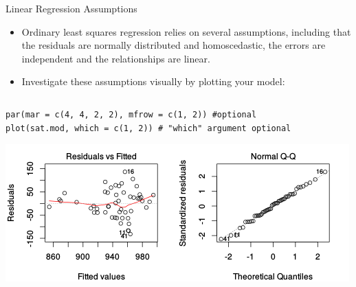 \documentclass[table,smaller]{beamer}
\begin{document}
\begin{frame}[fragile,label=sec-2-6]{Linear Regression Assumptions}
 \begin{itemize}
\item Ordinary least squares regression relies on several assumptions, including that the residuals are normally distributed and homoscedastic, the errors are independent and the relationships are linear.

\item Investigate these assumptions visually by plotting your model:
\end{itemize}
\begin{columns}  \begin{block}{}
\begin{verbatim}
par(mar = c(4, 4, 2, 2), mfrow = c(1, 2)) #optional
plot(sat.mod, which = c(1, 2)) # "which" argument optional
\end{verbatim}

\includegraphics[width=.9\linewidth]{images/regressionsAssumptions1.png}

\end{block} \end{columns}
\end{frame}
\end{document}
